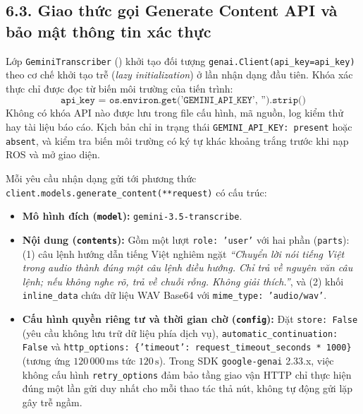 \subsection*{6.3. Giao thức gọi Generate Content API và bảo mật thông tin xác thực}

Lớp \texttt{GeminiTranscriber} () khởi tạo đối tượng \texttt{genai.Client(api\_key=api\_key)} theo cơ chế khởi tạo trễ (\textit{lazy initialization}) ở lần nhận dạng đầu tiên. Khóa xác thực chỉ được đọc từ biến môi trường của tiến trình:
\begin{equation*}
  \texttt{api\_key = os.environ.get('GEMINI\_API\_KEY', '').strip()}
\end{equation*}
Không có khóa API nào được lưu trong file cấu hình, mã nguồn, log kiểm thử hay tài liệu báo cáo. Kịch bản  chỉ in trạng thái \texttt{GEMINI\_API\_KEY: present} hoặc \texttt{absent}, và  kiểm tra biến môi trường có ký tự khác khoảng trắng trước khi nạp ROS và mở giao diện.

Mỗi yêu cầu nhận dạng gửi tới phương thức \texttt{client.models.generate\_content(**request)} có cấu trúc:
\begin{itemize}[leftmargin=1.2cm]
  \item \textbf{Mô hình đích (\texttt{model}):} \texttt{gemini-3.5-transcribe}.
  \item \textbf{Nội dung (\texttt{contents}):} Gồm một lượt \texttt{role: 'user'} với hai phần (\texttt{parts}): (1) câu lệnh hướng dẫn tiếng Việt nghiêm ngặt \textit{``Chuyển lời nói tiếng Việt trong audio thành đúng một câu lệnh điều hướng. Chỉ trả về nguyên văn câu lệnh; nếu không nghe rõ, trả về chuỗi rỗng. Không giải thích.''}, và (2) khối \texttt{inline\_data} chứa dữ liệu WAV Base64 với \texttt{mime\_type: 'audio/wav'}.
  \item \textbf{Cấu hình quyền riêng tư và thời gian chờ (\texttt{config}):} Đặt \texttt{store: False} (yêu cầu không lưu trữ dữ liệu phía dịch vụ), \texttt{automatic\_continuation: False} và \texttt{http\_options: \{'timeout': request\_timeout\_seconds * 1000\}} (tương ứng $120\,000\,\text{ms}$ tức $120\,\text{s}$). Trong SDK \texttt{google-genai} 2.33.x, việc không cấu hình \texttt{retry\_options} đảm bảo tầng giao vận HTTP chỉ thực hiện đúng một lần gửi duy nhất cho mỗi thao tác thả nút, không tự động gửi lặp gây trễ ngầm.
\end{itemize}

